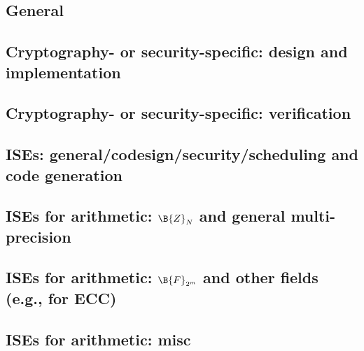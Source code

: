 
\subsection*{General}
\cite{SCARV:Gutmann:00}
\cite{SCARV:WuWeaAus:01}
\cite{SCARV:MTRGS:99}
\cite{SCARV:GGHJPTW:11}
\cite{SCARV:CosLebDev:16}

\subsection*{Cryptography- or security-specific: design and implementation}
\cite{SCARV:FouMoo:05,SCARV:Fournier:07,SCARV:KocSavGro:08,SCARV:TheSisPne:09,SCARV:TilKirSze:10,SCARV:NREAMM:12,SCARV:YumSav:15,SCARV:RagAmbPar:15,SCARV:AweAus:17,SCARV:YHEF:18,SCARV:WJWDGSN:18}

\subsection*{Cryptography- or security-specific: verification}
\cite{SCARV:KZDN:18}

\subsection*{ISEs: general/codesign/security/scheduling and code generation}
\cite{SCARV:Fiskiran:05}
\cite{SCARV:BarGioMar:09}
\cite{SCARV:RegIen:16}
\cite{SCARV:FazLopOli:18}
\cite{SCARV:KLWGSTW:06,SCARV:GIPTV:06}
\cite{SCARV:RCSBKBLI:09}
\cite{SCARV:ManGre:10,SCARV:ManMagGre:10,SCARV:Manley:11}

\subsection*{ISEs for arithmetic: $\B{Z}_{N}$ and general multi-precision}
\cite{SCARV:Gro:02,SCARV:Gro:03,SCARV:GroKam:03:a,SCARV:GAST:05,SCARV:GroTilSze:07}
\subsection*{ISEs for arithmetic: $\B{F}_{2^m}$ and other fields (e.g., for ECC)}
\cite{SCARV:GroKam:03:b,SCARV:FisLee:04,SCARV:GroKumPaa:04,SCARV:KumPaa:04,SCARV:BBGM:08}
\subsection*{ISEs for arithmetic: misc}
\cite{SCARV:GroKam:03,SCARV:GroSav:04,SCARV:VejPagGro:07}

